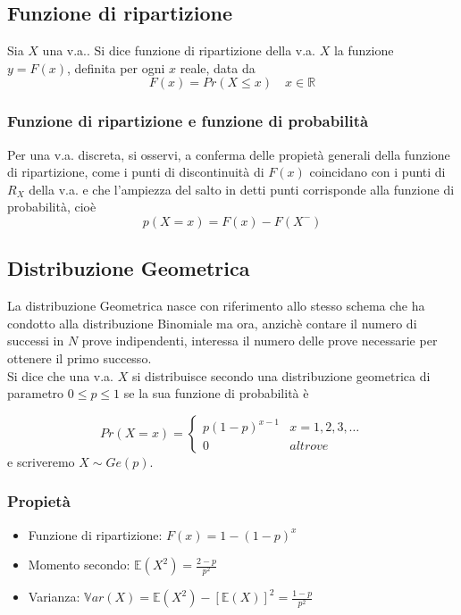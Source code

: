 \documentclass[a4paper]{report}
\begin{document}
   \subsection{Funzione di ripartizione}
   Sia $X$ una v.a.. Si dice funzione di ripartizione della v.a. $X$ la funzione $y=F(x)$, definita per ogni $x$ reale, data da
   \[ F(x) = Pr(X \leqslant x) \quad x \in \mathbb{R} \]

  \subsubsection{Funzione di ripartizione e funzione di probabilità}
  Per una v.a. discreta, si osservi, a conferma delle propietà generali della funzione di ripartizione, come i punti di discontinuità di $F(x)$ coincidano con i punti di $R_X$ della v.a. e che l'ampiezza del salto in detti punti corrisponde alla funzione di probabilità, cioè
  \[ p(X=x) = F(x) - F(X^-) \]

  \subsection{Distribuzione Geometrica}
  La distribuzione Geometrica nasce con riferimento allo stesso schema che ha condotto alla distribuzione Binomiale ma ora, anzichè contare il numero di successi in $N$ prove indipendenti, interessa il numero delle prove necessarie per ottenere il primo successo.\\

  Si dice che una v.a. $X$ si distribuisce secondo una distribuzione geometrica di parametro $0 \leqslant p \leqslant 1$ se la sua funzione di probabilità è

  \[
    Pr(X=x)=
      \begin{cases}
        p(1-p)^{x-1} & x = 1,2,3,\dots \\
        0 & altrove
      \end{cases}
  \]
  e scriveremo $X \sim Ge(p)$.
  \subsubsection{Propietà}
  \begin{itemize}
    \item Funzione di ripartizione: $F(x) =   1-(1-p)^x$
    \item Momento secondo: $ \mathbb{E}(X^2) = \frac{2-p}{p^2} $
    \item Varianza: $ \mathbb{V}ar(X) = \mathbb{E}(X^2) - [\mathbb{E}(X)]^2 = \frac{1-p}{p^2} $
  \end{itemize}
\end{document}
